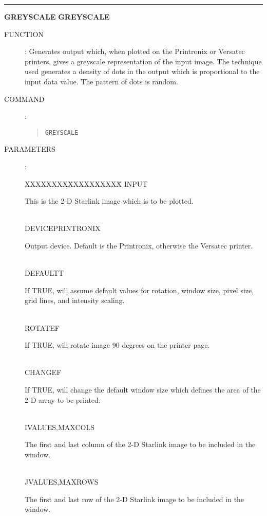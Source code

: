 \goodbreak
\rule{\textwidth}{0.3mm}
{\Large {\bf GREYSCALE} \hfill {\bf GREYSCALE}}
\begin{description}
\item [FUNCTION]:
Generates output which, when plotted on the Printronix or Versatec printers,
gives a greyscale representation of the input image. 
The technique used generates a density of dots in the output which is
proportional to the input data value.
The pattern of dots is random.
\item [COMMAND]:
\begin{quote}
{\tt GREYSCALE}
\end{quote}
\item [PARAMETERS] :
\begin{tabbing}
XXXXXXXX\=XXXXXXXXXX\=\kill
INPUT\>\>\begin{minipage}[t]{100mm}
This is the 2-D Starlink image which is to be plotted.
\end{minipage}\\
DEVICE\>PRINTRONIX\>\begin{minipage}[t]{100mm}
Output device.
Default is the Printronix, otherwise the Versatec printer.
\end{minipage}\\
DEFAULT\>T\>\begin{minipage}[t]{100mm}
If TRUE, will assume default values for rotation, window size, pixel size,
grid lines, and intensity scaling.
\end{minipage}\\
ROTATE\>F\>\begin{minipage}[t]{100mm}
If TRUE, will rotate image 90 degrees on the printer page.
\end{minipage}\\
CHANGE\>F\>\begin{minipage}[t]{100mm}
If TRUE, will change the default window size which defines the area of the 2-D
array to be printed.
\end{minipage}\\
IVALUES,MAXCOLS\>\begin{minipage}[t]{100mm}
The first and last column of the 2-D Starlink image to be included in the
window.
\end{minipage}\\
JVALUES,MAXROWS\>\begin{minipage}[t]{100mm}
The first and last row of the 2-D Starlink image to be included in the window.
\end{minipage}\\

\end{tabbing}
\end{description}
